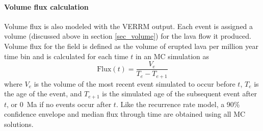 \documentclass[12pt,letter]{article}
\begin{document}
\paragraph{Volume flux calculation} Volume flux is also modeled with the VERRM output. Each event is assigned a volume (discussed above in section \ref{sec_volume}) for the lava flow it produced. Volume flux for the field is defined as the volume of erupted lava per million year time bin and is calculated for each time $t$ in an MC simulation as
\begin{equation}
\text{Flux}(t) = \frac{V_e}{T_e-T_{e+1}}
\label{eq_VolFlux}
\end{equation}
where $V_e$ is the volume of the most recent event simulated to occur before $t$, $T_e$ is the age of the event, and $T_{e+1}$ is the simulated age of the subsequent event after $t$, or 0~Ma if no events occur after $t$. Like the recurrence rate model, a 90\% confidence envelope and median flux through time are obtained using all MC solutions.
\end{document}
